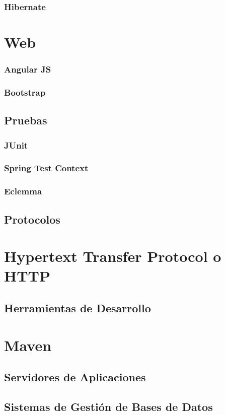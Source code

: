\documentclass[12pt, a4paper, twoside]{book}
\begin{document}
	\subsubsection{Hibernate}	
	\section{Web}
	\subsubsection{Angular JS}
	\subsubsection{Bootstrap}     
	\subsection{Pruebas}
	\subsubsection{JUnit}
	\subsubsection{Spring Test Context}
	\subsubsection{Eclemma}	
	\subsection{Protocolos}
	\section{Hypertext Transfer Protocol o HTTP}
	\subsection{Herramientas de Desarrollo}
	\section{Maven}
	
	\subsection{Servidores de Aplicaciones}
	
	\subsection{Sistemas de Gestión de Bases de Datos}
	
\end{document}
